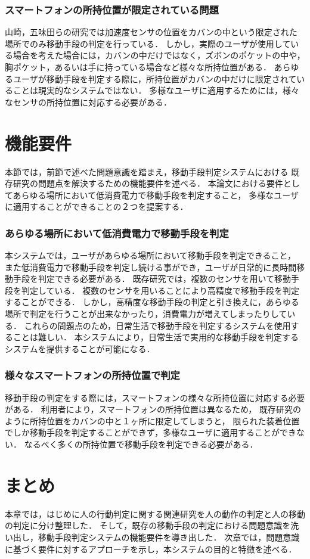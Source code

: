 \subsubsection*{スマートフォンの所持位置が限定されている問題}
山崎，五味田らの研究では加速度センサの位置をカバンの中という限定された場所でのみ移動手段の判定を行っている．
しかし，実際のユーザが使用している場合を考えた場合には，カバンの中だけではなく，ズボンのポケットの中や，胸ポケット，あるいは手に持っている場合など様々な所持位置がある．
あらゆるユーザが移動手段を判定する際に，所持位置がカバンの中だけに限定されていることは現実的なシステムではない．
多様なユーザに適用するためには，様々なセンサの所持位置に対応する必要がある．

\section{機能要件}
本節では，前節で述べた問題意識を踏まえ，移動手段判定システムにおける
既存研究の問題点を解決するための機能要件を述べる．
本論文における要件としてあらゆる場所において低消費電力で移動手段を判定すること，
多様なユーザに適用することができることの２つを提案する．

\subsubsection*{あらゆる場所において低消費電力で移動手段を判定}
本システムでは，ユーザがあらゆる場所において移動手段を判定できること，
また低消費電力で移動手段を判定し続ける事ができ，ユーザが日常的に長時間移動手段を判定できる必要がある．
既存研究では，複数のセンサを用いて移動手段を判定している．
複数のセンサを用いることにより高精度で移動手段を判定することができる．
しかし，高精度な移動手段の判定と引き換えに，あらゆる場所で判定を行うことが出来なかったり，消費電力が増えてしまったりしている．
これらの問題点のため，日常生活で移動手段を判定するシステムを使用することは難しい．
本システムにより，日常生活で実用的な移動手段を判定するシステムを提供することが可能になる．

\subsubsection*{様々なスマートフォンの所持位置で判定}
移動手段の判定をする際には，スマートフォンの様々な所持位置に対応する必要がある．
利用者により，スマートフォンの所持位置は異なるため，
既存研究のように所持位置をカバンの中と１ヶ所に限定してしまうと，
限られた装着位置でしか移動手段を判定することができず，多様なユーザに適用することができない．
なるべく多くの所持位置で移動手段を判定できる必要がある．

\section{まとめ}
本章では，はじめに人の行動判定に関する関連研究を人の動作の判定と人の移動の判定に分け整理した．
そして，既存の移動手段の判定における問題意識を洗い出し，移動手段判定システムの機能要件を導き出した．
次章では，問題意識に基づく要件に対するアプローチを示し，本システムの目的と特徴を述べる．